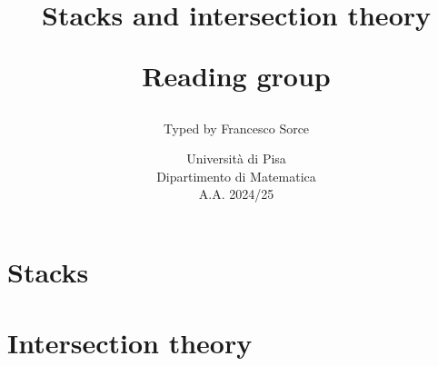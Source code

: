 \documentclass[a4paper]{report}
\title{\huge Stacks and intersection theory
\vspace{0.7cm}

\Large Reading group}
\author{\Large Typed by Francesco Sorce}
\date{Università di Pisa\\
Dipartimento di Matematica\\
A.A. 2024/25}
\begin{document}
\maketitle

\tableofcontents
\newpage

\part{Stacks}




\part{Intersection theory}



\appendix


\end{document}
